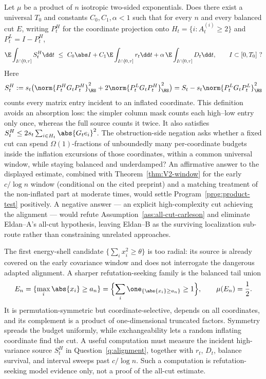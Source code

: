\documentclass[../../main.tex]{subfiles}
\begin{document}
\begin{question}
\label{q:alignment}
Let $\mu$ be a product of $n$ isotropic two-sided exponentials. Does there exist a universal
$T_0$ and constants $C_0,C_1,\alpha<1$ such that for every $n$ and every balanced cut $E$,
writing $P_t^H$ for the coordinate projection onto
$H_t=\{i:A_t^{(i)}\ge2\}$ and $P_t^L=I-P_t^H$,
\[
  \E\int_{I\cap[0,\tau]} S_t^H\dd t
  \ \le\ C_0\abs I+C_1\E\int_{I\cap[0,\tau]}r_t\dd t
  +\alpha\,\E\int_{I\cap[0,\tau]}D_t\dd t ,
  \qquad I\subset[0,T_0]\ ?
\]
Here
\[
 S_t^H:=s_t\bigl(\norm{P_t^HG_tP_t^H}_\HS^2
       +2\norm{P_t^LG_tP_t^H}_\HS^2\bigr)
 =S_t-s_t\norm{P_t^LG_tP_t^L}_\HS^2
\]
counts every matrix entry incident to an inflated coordinate. This definition avoids an
absorption loss: the simpler column mask counts each high--low entry only once, whereas the full
source counts it twice. It also satisfies
$S_t^H\le2s_t\sum_{i\in H_t}\abs{G_te_i}^2$.
The obstruction-side negation asks whether a fixed cut can spend
$\Omega(1)$-fractions of unboundedly many per-coordinate budgets inside the inflation
excursions of those coordinates, within a common universal window, while staying balanced and
underdamped? An affirmative answer to the displayed estimate, combined with
Theorem~\textup{\ref{thm:V2-window}} for the early $c/\log n$ window (conditional on the cited
preprint) and a matching treatment of the
non-inflated part at moderate times, would settle Program~\ref{prog:product-test} positively. A negative answer
--- an explicit high-complexity cut achieving the alignment --- would refute Assumption~\ref{ass:all-cut-carleson}
and eliminate Eldan--A's all-cut hypothesis, leaving Eldan--B as the surviving localization
sub-route rather than constraining unrelated approaches.
\end{question}

\begin{remark}
\label{rem:test-family}
The first energy-shell candidate $\{\sum_i x_i^2\ge\theta\}$ is too radial: its source is already
covered on the early covariance window and does not interrogate the dangerous adapted alignment.
A sharper refutation-seeking family is the balanced tail union
\[
  E_n=\{\max_i\abs{x_i}\ge a_n\}
     =\Bigl\{\sum_i\one_{\{\abs{x_i}\ge a_n\}}\ge1\Bigr\},
  \qquad \mu(E_n)=\frac12.
\]
It is permutation-symmetric but coordinate-selective, depends on all coordinates, and its
complement is a product of one-dimensional truncated factors. Symmetry spreads the budget
uniformly, while exchangeability lets a random inflating coordinate find the cut. A useful
computation must measure the incident high-variance source $S_t^H$ in
Question~\ref{q:alignment}, together with $r_t$, $D_t$, balance survival, and interval sweeps
past $c/\log n$. Such a computation is refutation-seeking model evidence only, not a proof of
the all-cut estimate.
\end{remark}
\end{document}
